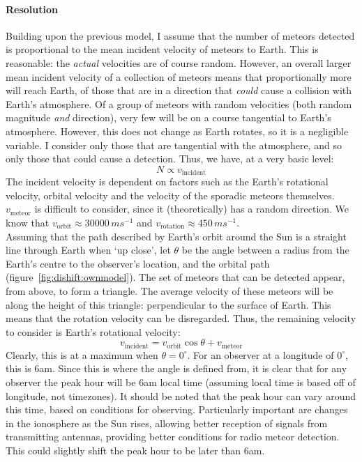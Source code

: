 \paragraph{Resolution\\}
\label{sec:dishift:model}
Building upon the previous model, I assume that the number of meteors detected is proportional to the mean incident velocity of meteors to Earth. This is reasonable: the {\it actual} velocities are of course random. However, an overall larger mean incident velocity of a collection of meteors means that proportionally more will reach Earth, of those that are in a direction that {\it could} cause a collision with Earth's atmosphere. Of a group of meteors with random velocities (both random magnitude {\it and} direction), very few will be on a course tangential to Earth's atmosphere. However, this does not change as Earth rotates, so it is a negligible variable. I consider only those that are tangential with the atmosphere, and so only those that could cause a detection. Thus, we have, at a very basic level:
\begin{equation}
N \propto v_{\text{incident}} 
\end{equation}
The incident velocity is dependent on factors such as the Earth's rotational velocity, orbital velocity and the velocity of the sporadic meteors themselves. $v_{\text{meteor}}$ is difficult to consider, since it (theoretically) has a random direction. We know that $v_{\text{orbit}} \approx 30000 \, ms^{-1}$ and  $v_{\text{rotation}} \approx 450 \, ms^{-1}$.\\
Assuming that the path described by Earth's orbit around the Sun is a straight line through Earth when `up close', let $\theta$ be the angle between a radius from the Earth's centre to the observer's location, and the orbital path (figure~\ref{fig:dishift:ownmodel}). The set of meteors that can be detected appear, from above, to form a triangle. The average velocity of these meteors will be along the height of this triangle: perpendicular to the surface of Earth. This means that the rotation velocity can be disregarded. Thus, the remaining velocity to consider is Earth's rotational velocity:
\begin{equation}
v_{\text{incident}} = v_{\text{orbit}} \cos \theta + v_{\text{meteor}}
\end{equation}
Clearly, this is at a maximum when $\theta = 0^{\circ}$. For an observer at a longitude of $0^{\circ}$, this is 6am. Since this is where the angle is defined from, it is clear that for any observer the peak hour will be 6am local time (assuming local time is based off of longitude, not timezones). It should be noted that the peak hour can vary around this time, based on conditions for observing. Particularly important are changes in the ionosphere as the Sun rises, allowing better reception of signals from transmitting antennas, providing better conditions for radio meteor detection. This could slightly shift the peak hour to be later than 6am.

